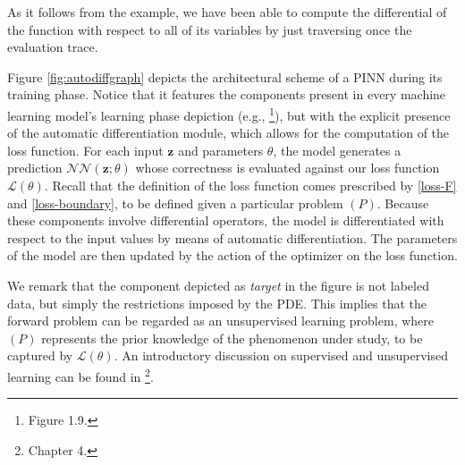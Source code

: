 \documentclass[12pt]{report} %
\newcommand{\tmmathbf}[1]{\ensuremath{\boldsymbol{#1}}}
\begin{document}
As it follows from the example, we have been able to compute the differential of the function with respect to all of its variables by just traversing once the evaluation trace.

Figure \ref{fig:autodiffgraph} depicts the architectural scheme of a PINN during its training phase. Notice that it features the components present in every machine learning model's learning phase depiction (e.g., \cite{chollet2021deep}\footnote{Figure 1.9.}), but with the explicit presence of the automatic differentiation module, which allows for the computation of the loss function. For each input $\tmmathbf{z}$ and parameters $\theta$, the model generates a prediction $\mathcal{NN}(\tmmathbf{z};\theta)$ whose correctness is evaluated against our loss function $\mathcal{L}(\theta)$. Recall that the definition of the loss function comes prescribed by \eqref{loss-F} and \eqref{loss-boundary}, to be defined given a particular problem $(P)$. Because these components involve differential operators, the model is differentiated with respect to the input values by means of automatic differentiation. The parameters of the model are then updated by the action of the optimizer on the loss function. %

We remark that the component depicted as \textit{target} in the figure is not labeled data, but simply the restrictions imposed by the PDE. This implies that the forward problem can be regarded as an unsupervised learning problem, where $(P)$ represents the prior knowledge of the phenomenon under study, to be captured by $\mathcal{L}(\theta)$. An introductory discussion on supervised and unsupervised learning can be found in \cite{chollet2021deep}\footnote{Chapter 4.}.
\end{document}
